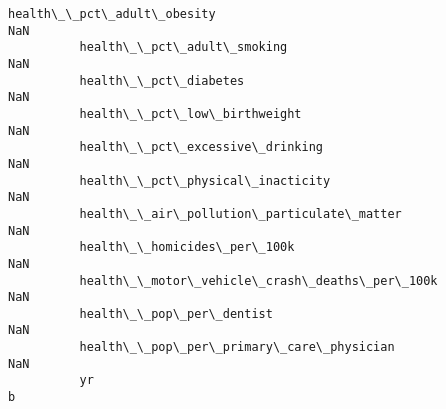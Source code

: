 \documentclass[11pt]{article}
\begin{document}
\begin{Verbatim}[commandchars=\\\{\}]
          health\_\_pct\_adult\_obesity                                                                       NaN   
          health\_\_pct\_adult\_smoking                                                                       NaN   
          health\_\_pct\_diabetes                                                                            NaN   
          health\_\_pct\_low\_birthweight                                                                     NaN   
          health\_\_pct\_excessive\_drinking                                                                  NaN   
          health\_\_pct\_physical\_inacticity                                                                 NaN   
          health\_\_air\_pollution\_particulate\_matter                                                        NaN   
          health\_\_homicides\_per\_100k                                                                      NaN   
          health\_\_motor\_vehicle\_crash\_deaths\_per\_100k                                                     NaN   
          health\_\_pop\_per\_dentist                                                                         NaN   
          health\_\_pop\_per\_primary\_care\_physician                                                          NaN   
          yr                                                                                                b   
          

\end{Verbatim}
\end{document}
